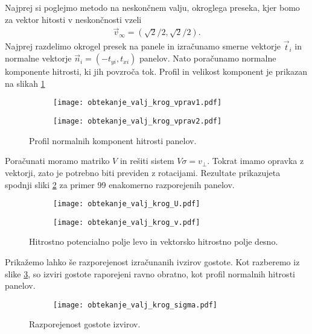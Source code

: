 \documentclass[12pt,a4paper]{article}
\begin{document}
Najprej si poglejmo metodo na neskončnem valju, okroglega preseka, kjer bomo za  vektor hitosti v neskončnosti vzeli
\begin{align*}
\vec{v}_{\infty}=(\sqrt{2}/2, \sqrt{2}/2).
\end{align*}
Najprej razdelimo okrogel presek na panele in izračunamo smerne vektorje $\vec{t}_i$ in normalne 
vektorje $\vec{n}_i = (-t_{y i}, t_{x i})$ panelov. Nato poračunamo normalne komponente hitrosti, ki jih povzroča tok. Profil in velikost komponent je prikazan na slikah \ref{fig:slika9}
\begin{figure}[H]
    \centering
    \begin{subfigure}[b]{0.45\textwidth}  			
        \texttt{[image: obtekanje\_valj\_krog\_vprav1.pdf]}
    \end{subfigure}
    \begin{subfigure}[b]{0.45\textwidth}  			
        \texttt{[image: obtekanje\_valj\_krog\_vprav2.pdf]}
    \end{subfigure}
    \caption{Profil normalnih komponent hitrosti panelov.} \label{fig:slika9}
\end{figure}
\noindent Poračunati moramo matriko $V$ in rešiti sistem $V \sigma =v_{\perp}$. Tokrat imamo opravka z vektorji, zato je potrebno biti previden z rotacijami. Rezultate prikazujeta spodnji sliki \ref{fig:slika10} za primer 99 enakomerno razporejenih panelov.
\begin{figure}[H]
    \centering
    \begin{subfigure}[b]{0.45\textwidth}  			
        \texttt{[image: obtekanje\_valj\_krog\_U.pdf]}
    \end{subfigure}
    \begin{subfigure}[b]{0.45\textwidth}  			
        \texttt{[image: obtekanje\_valj\_krog\_v.pdf]}
    \end{subfigure}
    \caption{Hitrostno potencialno polje levo in vektorsko hitrostno polje desno.} \label{fig:slika10}
\end{figure}
\noindent Prikažemo lahko še razporejenost izračunanih ivzirov gostote. Kot razberemo iz slike \ref{fig:slika11}, so izviri gostote raporejeni ravno obratno, kot profil normalnih hitrosti panelov.
\begin{figure}[H]
    \centering
    \begin{subfigure}[b]{0.4\textwidth}  			
        \texttt{[image: obtekanje\_valj\_krog\_sigma.pdf]}
    \end{subfigure}
    \caption{Razporejenost gostote izvirov.} \label{fig:slika11}
\end{figure}
\end{document}
